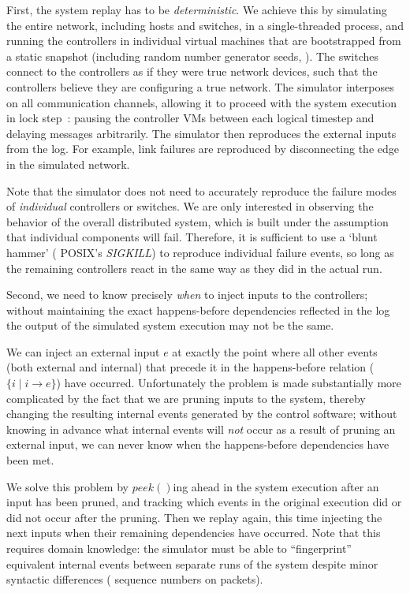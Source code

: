 {First, the system replay has to be {\em deterministic}.
We achieve this by simulating the entire network, including hosts and
switches, in a single-threaded process, and running the controllers in
individual virtual machines that are
bootstrapped from a static snapshot (including random number generator
seeds, \etc{}). The switches connect to the controllers as if they were true
network devices, such that the controllers believe they are configuring a true
network. The simulator interposes on all communication channels,
allowing it to proceed with the system execution in
lock step~\cite{Dunlap:2002:REI:844128.844148}:
pausing the controller VMs between each logical timestep and delaying messages
arbitrarily. The simulator then reproduces the external inputs from the log.
For example, link failures are reproduced by disconnecting the edge in
the simulated network.

Note that the simulator does not need
to accurately reproduce the failure modes of {\em individual} controllers or switches.
We are only interested in observing the behavior of the overall distributed system, which is
built under the assumption that individual components will fail.
Therefore, it is sufficient to use a `blunt hammer' (\eg{} POSIX's {\em SIGKILL}) to reproduce individual
failure events, so long as the remaining controllers react in the same
way as they did in the actual run.

Second, we need to know precisely {\em when} to inject inputs to the controllers;
without maintaining the exact happens-before dependencies reflected in the
log the output of the simulated system execution may not be the same.

We can inject an external input $e$ at exactly the point where all other
events (both external and internal) that precede it in the happens-before
relation ($\{i \mid i \rightarrow e\}$) have occurred. Unfortunately the problem is made
substantially more complicated by the fact that we are pruning inputs to the
system, thereby changing the resulting internal events generated by the control
software; without knowing in advance what internal events will {\em not} occur
as a result of pruning an external input, we can never know when the happens-before
dependencies have been met.

We solve this problem by $peek()$ing ahead in the system execution after an
input has been pruned, and tracking which events in the original execution did
or did not occur after the pruning. Then we replay again, this time injecting
the next inputs when their remaining dependencies have occurred. Note that
this requires domain knowledge: the simulator must be able to ``fingerprint''
equivalent internal events between separate runs of
the system despite minor
syntactic differences (\eg{} sequence numbers on packets).

}
